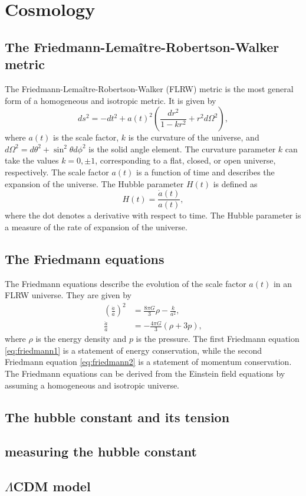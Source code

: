 \chapter{Cosmology}

\section{The Friedmann-Lemaître-Robertson-Walker metric}

The Friedmann-Lemaître-Robertson-Walker (FLRW) metric is the most general form of a homogeneous and isotropic metric. It is given by
\begin{equation}
    ds^2 = -dt^2 + a(t)^2 \left( \frac{dr^2}{1 - kr^2} + r^2 d\Omega^2 \right),
\end{equation}
where $a(t)$ is the scale factor, $k$ is the curvature of the universe, and $d\Omega^2 = d\theta^2 + \sin^2\theta d\phi^2$ is the solid angle element. The curvature parameter $k$ can take the values $k = 0, \pm 1$, corresponding to a flat, closed, or open universe, respectively. The scale factor $a(t)$ is a function of time and describes the expansion of the universe. The Hubble parameter $H(t)$ is defined as
\begin{equation}
    H(t) = \frac{\dot{a}(t)}{a(t)},
\end{equation}
where the dot denotes a derivative with respect to time. The Hubble parameter is a measure of the rate of expansion of the universe.

\section{The Friedmann equations}

The Friedmann equations describe the evolution of the scale factor $a(t)$ in an FLRW universe. They are given by
\begin{align}
    \left( \frac{\dot{a}}{a} \right)^2 & = \frac{8\pi G}{3} \rho - \frac{k}{a^2}, \label{eq:friedmann1} \\
    \frac{\ddot{a}}{a}                 & = -\frac{4\pi G}{3} (\rho + 3p), \label{eq:friedmann2}
\end{align}
where $\rho$ is the energy density and $p$ is the pressure. The first Friedmann equation \eqref{eq:friedmann1} is a statement of energy conservation, while the second Friedmann equation \eqref{eq:friedmann2} is a statement of momentum conservation. The Friedmann equations can be derived from the Einstein field equations by assuming a homogeneous and isotropic universe.

\section{The hubble constant and its tension}


\section{measuring the hubble constant}

\section{\texorpdfstring{$\Lambda$CDM model}{ΛCDM model}}

